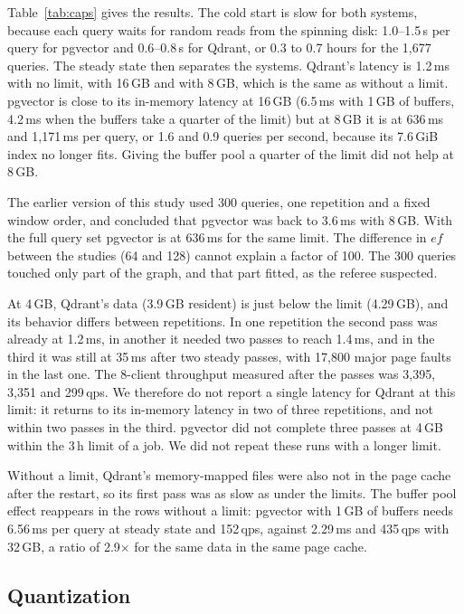 \documentclass[preprint,12pt]{elsarticle}
\begin{document}
Table~\ref{tab:caps} gives the results. The cold start is slow for both systems, because each query waits for random reads from the
spinning disk: 1.0--1.5\,s per query for pgvector and 0.6--0.8\,s for Qdrant, or 0.3 to
0.7 hours for the 1{,}677 queries. The steady state then separates the systems. Qdrant's
latency is 1.2\,ms with no limit, with 16\,GB and with 8\,GB, which is the same as without
a limit. pgvector is close to its in-memory latency at 16\,GB (6.5\,ms with 1\,GB of
buffers, 4.2\,ms when the buffers take a quarter of the limit) but at 8\,GB it is at
636\,ms and 1{,}171\,ms per query, or 1.6 and 0.9 queries per second, because its 7.6\,GiB
index no longer fits. Giving the buffer pool a quarter of the limit did not help at 8\,GB.

The earlier version of this study used 300 queries, one repetition and a fixed window
order, and concluded that pgvector was back to 3.6\,ms with 8\,GB. With the full query set
pgvector is at 636\,ms for the same limit. The difference in $ef$ between the studies (64
and 128) cannot explain a factor of 100. The 300 queries touched only part of the graph,
and that part fitted, as the referee suspected.

At 4\,GB, Qdrant's data (3.9\,GB resident) is just below the limit (4.29\,GB), and its
behavior differs between repetitions. In one repetition the second pass was already at
1.2\,ms, in another it needed two passes to reach 1.4\,ms, and in the third it was still at
35\,ms after two steady passes, with 17{,}800 major page faults in the last one. The
8-client throughput measured after the passes was 3{,}395, 3{,}351 and 299\,qps. We
therefore do not report a single latency for Qdrant at this limit: it returns to its
in-memory latency in two of three repetitions, and not within two passes in the third.
pgvector did not complete three passes at 4\,GB within the 3\,h limit of a job. We did not
repeat these runs with a longer limit.

Without a limit, Qdrant's memory-mapped files were also not in the page cache after
the restart, so its first pass was as slow as under the limits. The buffer pool effect
reappears in the rows without a limit: pgvector with 1\,GB of buffers needs 6.56\,ms per
query at steady state and 152\,qps, against 2.29\,ms and 435\,qps with 32\,GB, a ratio of
2.9$\times$ for the same data in the same page cache.

\subsection{Quantization}
\label{sec:quant}
\end{document}
